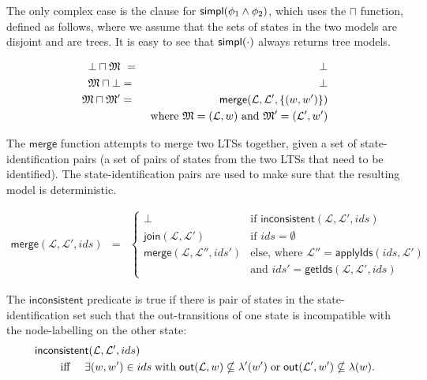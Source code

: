 The only complex case is the clause for $\mathsf{simpl}(\phi_1 \land \phi_2)$,
which uses the $\sqcap$ function, defined as follows, where we assume
that the sets of states in the two models are disjoint and are trees.
It is easy to see that $\mathsf{simpl}(\cdot)$ always returns tree models.

\begin{eqnarray*}
  \bot \sqcap \frak{M}  &\ =\ &  \bot  \\
  \frak{M} \sqcap \bot      & = &  \bot  
     \\
  \frak{M} \sqcap \frak{M}'
     & = & 
     \mathsf{merge}(\mathcal{L}, \mathcal{L}', \{(w,w')\}) 
     \\
     & & \text{where } \frak{M} = (\mathcal{L}, w) \text{ and } \frak{M}' = (\mathcal{L'}, w')
\end{eqnarray*}

\NI The $\mathsf{merge}$ function attempts to merge two LTSs together, given a set of state-identification pairs (a set of pairs of states from the two LTSs that need to be identified).
The state-identification pairs are used to make sure that the resulting model is deterministic.

\begin{eqnarray*}
  \mathsf{merge}(\mathcal{L}, \mathcal{L}', ids) 
     & = & 
  \begin{cases}
    \bot & \text{if } \mathsf{inconsistent}(\mathcal{L}, \mathcal{L}', ids)  \\
    \mathsf{join}(\mathcal{L}, \mathcal{L}') & \text{if } ids = \emptyset  \\
    \mathsf{merge}(\mathcal{L}, \mathcal{L}'', ids')  & \text{else, where }
          \mathcal{L}'' = \mathsf{applyIds}(ids, \mathcal{L}') \\
          & \text{and } ids' = \mathsf{getIds}(\mathcal{L}, \mathcal{L}', ids)
  \end{cases}
\end{eqnarray*}

\NI The $\mathsf{inconsistent}$ predicate is true if there is pair of
states in the state-identification set such that the out-transitions
of one state is incompatible with the node-labelling on the other
state:
\begin{eqnarray*}
  \lefteqn{\mathsf{inconsistent}(\mathcal{L}, \mathcal{L}', ids)}\qquad
     \\
     &\text{ iff }& \exists (w,w') \in ids \; \text{with} \; \mathsf{out}(\mathcal{L},w) \nsubseteq \lambda'(w') \; \text{or} \; \mathsf{out}(\mathcal{L}',w') \nsubseteq \lambda(w).
\end{eqnarray*}
 
